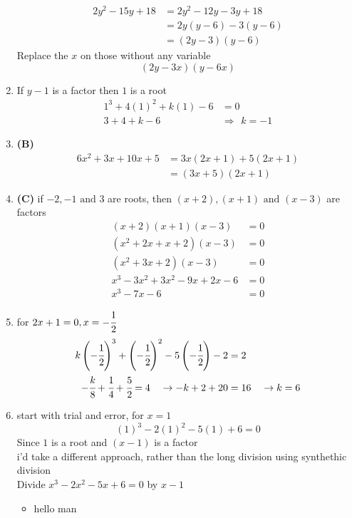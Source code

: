 \begin{multicols}{2}
\begin{enumerate}[label={\textbf{\arabic*.}}]
\begin{align*}
2y^2 - 15y + 18 &= 2y^2 -12y - 3y + 18  \\
&= 2y(y-6) -3(y-6)  \\
&= (2y-3)(y-6)
\end{align*}
Replace the $x$ on those without any variable
$$(2y-3x)(y-6x)$$
\item If $y-1$ is a factor then $1$ is a root
\begin{align*}
1^3 + 4(1)^2 + k(1) - 6 &= 0 \\
3+ 4 + k - 6 \hspace{5pt} &\Rightarrow \hspace{5pt} k = -1
\end{align*}
\item \textbf{(B)}
\begin{align*} 6x^2 + 3x + 10x + 5 &= 3x(2x + 1) + 5(2x+1) \\ &= (3x+5)(2x+1)
\end{align*}
\item \textbf{(C)} if $-2, -1 \text{ and } 3$ are roots, then $(x+2), (x+1) \text{ and } (x-3)$ are factors
\begin{align*}
(x+2)(x+1)(x-3) &= 0 \\
(x^2 + 2x + x + 2)(x-3) &= 0 \\
(x^2 + 3x + 2)(x-3) &= 0 \\
x^3 - 3x^2 +3x^2 - 9x + 2x -6 & = 0 \\
x^3 -7x -6 & = 0
\end{align*}
\item for $2x+1 = 0, x = -\cfrac{1}{2}$ \\
\begin{align*}
k\left(-\cfrac{1}{2}\right)^3 + \left(-\cfrac{1}{2}\right)^2 - 5\left(-\cfrac{1}{2}\right) - 2 &= 2 \\
-\cfrac{k}{8} + \cfrac{1}{4}+ \cfrac{5}{2}  = 4\hspace{10pt} \rightarrow -k + 2 + 20 &= 16 \hspace{10pt} \rightarrow k = 6
\end{align*}
\item start with trial and error, for $x = 1$
$$(1)^3 - 2(1)^2-5(1) + 6 = 0 $$ Since $1$ is a root and $(x-1)$ is a factor \\
i'd take a different approach, rather than the long division using synthethic division \\ Divide $x^3 - 2x^2 - 5x + 6 = 0$ by $x-1$
\begin{itemize}
\item  hello man
\end{itemize}


\end{enumerate}
\end{multicols}
